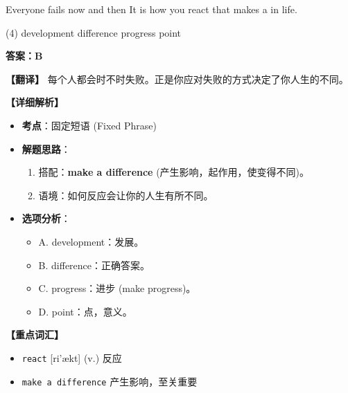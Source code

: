 \documentclass[11pt, a4paper]{article}
\newcommand{\analysis}[4]{
    \begin{solutionbox}
        \textbf{答案：#1}
        
        \textbf{【翻译】} #2
        
        \textbf{【详细解析】}
        #3
        
        \textbf{【重点词汇】}
        #4
    \end{solutionbox}
}
\newcommand{\blank}{\underline{\hspace{1.5cm}}}
\begin{document}
\begin{questions}
    \item Everyone fails now and then It is how you react that makes a \blank in life.
    \begin{tasks}(4)
        \task development \task difference \task progress \task point
    \end{tasks}
    \analysis{B}{每个人都会时不时失败。正是你应对失败的方式决定了你人生的不同。}{
        \begin{itemize}
            \item \textbf{考点}：固定短语 (Fixed Phrase)
            \item \textbf{解题思路}：
                \begin{enumerate}
                    \item 搭配：\textbf{make a difference} (产生影响，起作用，使变得不同)。
                    \item 语境：如何反应会让你的人生有所不同。
                \end{enumerate}
            \item \textbf{选项分析}：
                \begin{itemize}
                    \item A. development：发展。
                    \item B. difference：正确答案。
                    \item C. progress：进步 (make progress)。
                    \item D. point：点，意义。
                \end{itemize}
        \end{itemize}
    }{
        \begin{itemize}
            \item \texttt{react} [ri'ækt] (v.) 反应
            \item \texttt{make a difference} 产生影响，至关重要
        \end{itemize}
    }


\end{questions}
\end{document}
